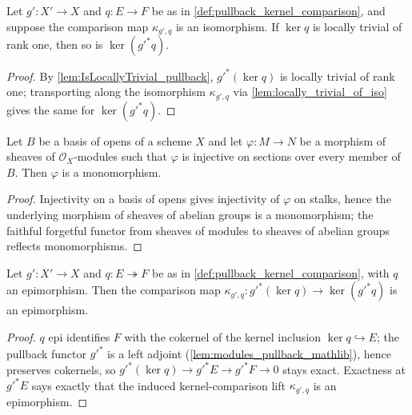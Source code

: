 \begin{lemma}
  \label{lem:pullback_kernel_isLocallyTrivial_of_isIso_kernelComparison}
  Let \(g' : X' \to X\) and \(q : E \to F\) be as in
  \cref{def:pullback_kernel_comparison}, and suppose the comparison map
  \(\kappa_{g',q}\) is an isomorphism. If \(\ker q\) is locally trivial of
  rank one, then so is \(\ker(g'^{*} q)\).
\end{lemma}
\begin{proof}\leanok
  By \cref{lem:IsLocallyTrivial_pullback}, \(g'^{*}(\ker q)\) is locally
  trivial of rank one; transporting along the isomorphism \(\kappa_{g',q}\)
  via \cref{lem:locally_trivial_of_iso} gives the same for
  \(\ker(g'^{*} q)\).
\end{proof}

\begin{lemma}
  \label{lem:modules_mono_of_injective_app_of_isBasis}
  Let \(B\) be a basis of opens of a scheme \(X\) and let
  \(\varphi : M \to N\) be a morphism of sheaves of \(\mathcal O_X\)-modules
  such that \(\varphi\) is injective on sections over every member of \(B\).
  Then \(\varphi\) is a monomorphism.
\end{lemma}
\begin{proof}\leanok
  Injectivity on a basis of opens gives injectivity of \(\varphi\) on
  stalks, hence the underlying morphism of sheaves of abelian groups is a
  monomorphism; the faithful forgetful functor from sheaves of modules to
  sheaves of abelian groups reflects monomorphisms.
\end{proof}

\begin{lemma}
  \label{lem:pullback_kernel_comparison_epi}
  Let \(g' : X' \to X\) and \(q : E \twoheadrightarrow F\) be as in
  \cref{def:pullback_kernel_comparison}, with \(q\) an epimorphism. Then the
  comparison map \(\kappa_{g',q} : g'^{*}(\ker q) \to \ker(g'^{*} q)\) is an
  epimorphism.
\end{lemma}
\begin{proof}\leanok
  \(q\) epi identifies \(F\) with the cokernel of the kernel inclusion
  \(\ker q \hookrightarrow E\); the pullback functor \(g'^{*}\) is a left
  adjoint (\cref{lem:modules_pullback_mathlib}), hence preserves cokernels,
  so \(g'^{*}(\ker q) \to g'^{*}E \to g'^{*}F \to 0\) stays exact. Exactness
  at \(g'^{*}E\) says exactly that the induced kernel-comparison lift
  \(\kappa_{g',q}\) is an epimorphism.
\end{proof}

